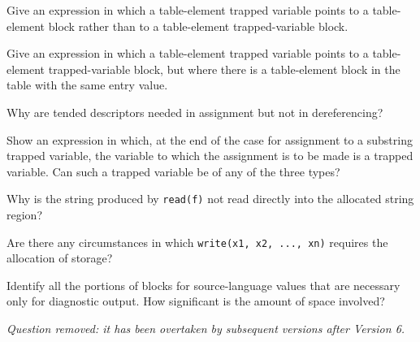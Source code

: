Give an expression in which a table-element
trapped variable points to a table-element block rather than to a
table-element trapped-variable block.

Give an expression in which a table-element
trapped variable points to a table-element trapped-variable block, but
where there is a table-element block in the table with the same entry
value.

Why are tended descriptors needed in assignment but not in dereferencing?

Show an expression in which, at the end of the case for
assignment to a substring trapped variable, the variable to which the
assignment is to be made is a trapped variable. Can such a trapped
variable be of any of the three types?

Why is the string produced by \texttt{read(f)}
not read directly into the allocated string region?

Are there any circumstances in which
\texttt{write(x1, x2, ..., xn)} requires the allocation of storage?

 Identify all the portions of blocks for
source-language values that are necessary only for diagnostic
output. How significant is the amount of space involved?

{\em Question removed: it has been overtaken by subsequent versions after Version 6.}
